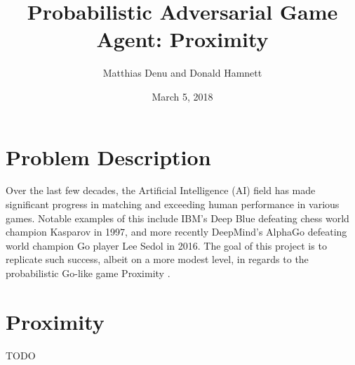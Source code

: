 \documentclass[10pt,letter]{article}
\begin{document}
\title{Probabilistic Adversarial Game Agent: Proximity}
\author{Matthias Denu and Donald Hamnett}
\date{March 5, 2018}
\maketitle
\begin{multicols}{2}
\section*{Problem Description}
\par
Over the last few decades, the Artificial Intelligence (AI) field has made significant progress in matching and exceeding human performance in various games. Notable examples of this include IBM's Deep Blue \cite{deepblue} defeating chess world champion Kasparov in 1997, and more recently DeepMind's AlphaGo \cite{alphago} defeating world champion Go player Lee Sedol in 2016. The goal of this project is to replicate such success, albeit on a more modest level, in regards to the probabilistic Go-like game Proximity \cite{proximity}.
\section*{Proximity}
\par
TODO

\end{multicols}
\end{document}
